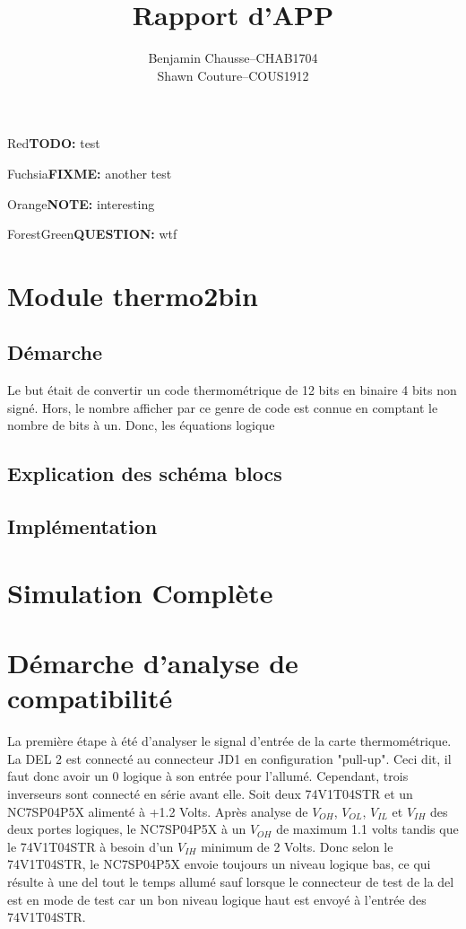 \documentclass[a11paper]{article}
\title{Rapport d'APP}
\author{
  \addtolength{\tabcolsep}{-0.4em}
  \begin{tabular}{rcl} %
      Benjamin Chausse & -- & CHAB1704 \\
      Shawn Couture    & -- & COUS1912 \\
  \end{tabular}
}
\newcommand{\todo}[1]{\begin{color}{Red}\textbf{TODO:} #1\end{color}}
\newcommand{\note}[1]{\begin{color}{Orange}\textbf{NOTE:} #1\end{color}}
\newcommand{\fixme}[1]{\begin{color}{Fuchsia}\textbf{FIXME:} #1\end{color}}
\newcommand{\question}[1]{\begin{color}{ForestGreen}\textbf{QUESTION:} #1\end{color}}
\begin{document}
\maketitle

\todo{test} \fixme{another test} \note{interesting} \question{wtf}

\section{Module thermo2bin}

\subsection{Démarche}
Le but était de convertir un code thermométrique de 12 bits en binaire 4 bits non signé. Hors, le nombre afficher par ce genre de code
est connue en comptant le nombre de bits à un. Donc, les équations logique

\subsection{Explication des schéma blocs}

\subsection{Implémentation}

\section{Simulation Complète}

\section{Démarche d'analyse de compatibilité}
La première étape à été d'analyser le signal d'entrée de la carte thermométrique. La DEL 2 est connecté au connecteur JD1 en
configuration "pull-up". Ceci dit, il faut donc avoir un 0 logique à son entrée pour l'allumé. Cependant, trois inverseurs sont
connecté en série avant elle. Soit deux 74V1T04STR et un NC7SP04P5X alimenté à +1.2 Volts. Après analyse de $V_{OH}$, $V_{OL}$, $V_{IL}$
et $V_{IH}$ des deux portes logiques, le NC7SP04P5X à un $V_{OH}$ de maximum 1.1 volts tandis que le 74V1T04STR à besoin d'un $V_{IH}$
minimum de 2 Volts. Donc selon le 74V1T04STR, le NC7SP04P5X envoie toujours un niveau logique bas, ce qui résulte à une del
tout le temps allumé sauf lorsque le connecteur de test de la del est en mode de test car un bon niveau logique haut est envoyé à
l'entrée des 74V1T04STR.
\end{document}
